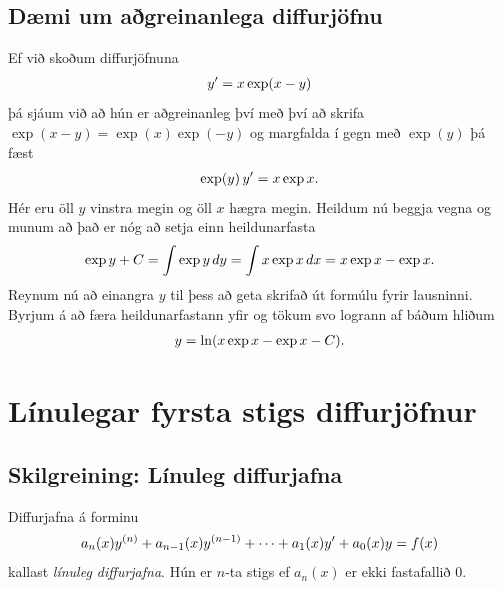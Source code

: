 \documentclass[a4paper,10pt,icelandic]{sphinxmanual}
\begin{document}
\subsection{Dæmi um aðgreinanlega diffurjöfnu}
\label{kafli08:daemi-um-agreinanlega-diffurjofnu}
Ef við skoðum diffurjöfnuna
\begin{gather}
\begin{split}y' = x\exp(x-y)\end{split}\notag
\end{gather}
þá sjáum við að hún er aðgreinanleg því með því að skrifa \(\exp(x-y) = \exp (x) \exp(-y)\) og
margfalda í gegn með \(\exp (y)\) þá fæst
\begin{gather}
\begin{split}\exp(y)\, y' = x\exp x.\end{split}\notag
\end{gather}
Hér eru öll \(y\) vinstra megin og öll \(x\) hægra megin.
Heildum nú beggja vegna og munum að það er nóg að setja einn heildunarfasta
\begin{gather}
\begin{split}\exp{y} + C = \int \exp y \, dy = \int x\exp x\, dx = x\exp x - \exp x.\end{split}\notag
\end{gather}
Reynum nú að einangra \(y\) til þess að geta skrifað út formúlu fyrir lausninni.
Byrjum á að færa heildunarfastann yfir og tökum svo logrann af báðum hliðum
\begin{gather}
\begin{split}y = \ln(x\exp x - \exp x - C).\end{split}\notag
\end{gather}

\section{Línulegar fyrsta stigs diffurjöfnur}
\label{kafli08:index-2}\label{kafli08:linulegar-fyrsta-stigs-diffurjofnur}

\subsection{Skilgreining: Línuleg diffurjafna}
\label{kafli08:skilgreining-linuleg-diffurjafna}\label{kafli08:index-3}
Diffurjafna á forminu
\begin{gather}
\begin{split}a_n(x)y^{(n)}+a_{n-1}(x)y^{(n-1)}+\cdots+a_1(x)y'+a_0(x)y=f(x)\end{split}\notag
\end{gather}
kallast \textit{línuleg diffurjafna}. Hún er \(n\)-ta stigs ef
\(a_n(x)\) er ekki fastafallið \(0\).
\end{document}
